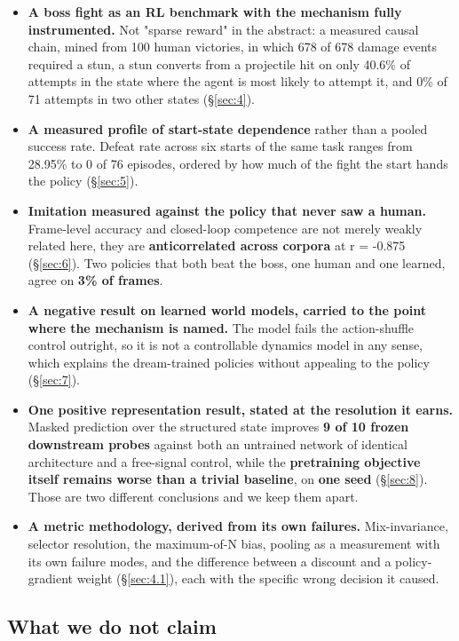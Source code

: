 \documentclass[11pt]{article}
\begin{document}
\begin{itemize}
\item \textbf{A boss fight as an RL benchmark with the mechanism fully instrumented.} Not "sparse reward" in the abstract: a measured causal chain, mined from 100 human victories, in which 678 of 678 damage events required a stun, a stun converts from a projectile hit on only 40.6\% of attempts in the state where the agent is most likely to attempt it, and 0\% of 71 attempts in two other states (\S\ref{sec:4}).
\item \textbf{A measured profile of start-state dependence} rather than a pooled success rate. Defeat rate across six starts of the same task ranges from 28.95\% to 0 of 76 episodes, ordered by how much of the fight the start hands the policy (\S\ref{sec:5}).
\item \textbf{Imitation measured against the policy that never saw a human.} Frame-level accuracy and closed-loop competence are not merely weakly related here, they are \textbf{anticorrelated across corpora} at r = -0.875 (\S\ref{sec:6}). Two policies that both beat the boss, one human and one learned, agree on \textbf{3\% of frames}.
\item \textbf{A negative result on learned world models, carried to the point where the mechanism is named.} The model fails the action-shuffle control outright, so it is not a controllable dynamics model in any sense, which explains the dream-trained policies without appealing to the policy (\S\ref{sec:7}).
\item \textbf{One positive representation result, stated at the resolution it earns.} Masked prediction over the structured state improves \textbf{9 of 10 frozen downstream probes} against both an untrained network of identical architecture and a free-signal control, while the \textbf{pretraining objective itself remains worse than a trivial baseline}, on \textbf{one seed} (\S\ref{sec:8}). Those are two different conclusions and we keep them apart.
\item \textbf{A metric methodology, derived from its own failures.} Mix-invariance, selector resolution, the maximum-of-N bias, pooling as a measurement with its own failure modes, and the difference between a discount and a policy-gradient weight (\S\ref{sec:4.1}), each with the specific wrong decision it caused.
\end{itemize}

\subsection{What we do not claim}
\end{document}

